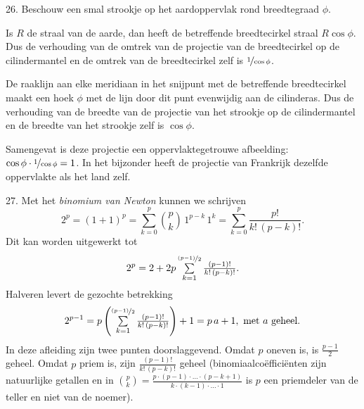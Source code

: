 \begin{problem}{26.}
    Beschouw een smal strookje op het aardoppervlak rond breedte\-graad $\phi$.

    Is $R$ de straal van de aarde, dan heeft de betreffende breedtecirkel straal $R \cos \phi$. Dus de verhouding van de omtrek van de projectie van de breedtecirkel op de cilindermantel en de omtrek van de breedte\-cirkel zelf is $\nicefrac{1}{\cos \phi}$.

    De raaklijn aan elke meridiaan in het snijpunt met de betreffende breedtecirkel maakt een hoek $\phi$ met de lijn door dit punt evenwijdig aan de cilinderas. Dus de verhouding van de breedte van de projectie van het strookje op de cilindermantel en de breedte van het strookje zelf is $\cos \phi$.

    Samengevat is deze projectie een oppervlaktegetrouwe afbeelding: $\cos \phi \cdot \nicefrac{1}{\cos \phi} = 1$. In het bijzonder heeft de projectie van Frankrijk dezelfde oppervlakte als het land zelf.
\end{problem}

\begin{problem}{27.}
    Met het \textit{binomium van Newton} kunnen we schrijven
    \begin{equation*}
        2^p = {(1+1)}^p = \textstyle\sum\limits_{k=0}^{p} \binom{p}{k}\, 1^{p-k}\, 1^k = \textstyle\sum\limits_{k=0}^{p} \frac{p!}{k!\, (p-k)!}.
    \end{equation*}
    Dit kan worden uitgewerkt tot
    \begin{equation*}
        2^p = 2 + 2 p \textstyle\sum\limits_{k=1}^{\nicefrac{(p-1)}{2}} \frac{(p-1)!}{k!\, (p-k)!}.
    \end{equation*}
    Halveren levert de gezochte betrekking
    \begin{equation*}
        2^{p-1} = p \left( \textstyle\sum\limits_{k=1}^{\nicefrac{(p-1)}{2}} \frac{(p-1)!}{k!\, (p-k)!} \right) + 1 = p\, a + 1, \text{ met } a \text{ geheel}.
    \end{equation*}
    In deze afleiding zijn twee punten doorslaggevend. Omdat $p$ oneven is, is $\frac{p-1}{2}$ geheel. Omdat $p$ priem is, zijn $\frac{(p-1)!}{k!\, (p-k)!}$ geheel (binomiaal\-coëfficiënten zijn natuurlijke getallen en in $\binom{p}{k} = \frac{p \cdot (p-1) \cdot \dots \cdot (p-k+1)}{k \cdot (k-1) \cdot \dots \cdot 1}$ is $p$ een priemdeler van de teller en niet van de noemer).
\end{problem}

\clearpage

